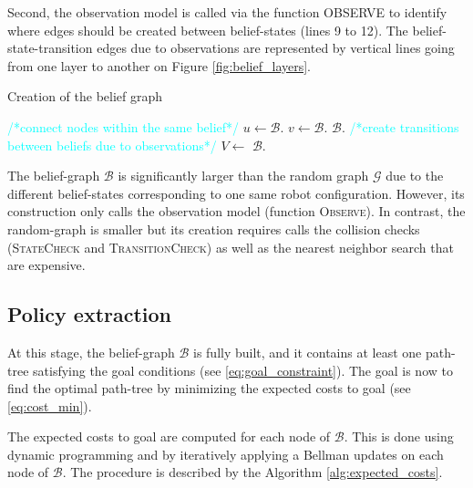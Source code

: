 \documentclass[letterpaper, 10 pt, conference]{ieeeconf}  %
\begin{document}
Second, the observation model is called via the function \textsc{OBSERVE} to identify where edges should be created between belief-states (lines 9 to 12). The belief-state-transition edges due to observations are represented by vertical lines going from one layer to another on Figure \ref{fig:belief_layers}.

\begin{algorithm}[H]
\caption{Creation of the belief graph}
\label{alg:belief}
\begin{algorithmic}[1]
	\State \textcolor{cyan}{\footnotesize/*connect nodes within the same belief*/}
			\State $u \gets \mathcal{B}$.
			\State $v \gets \mathcal{B}$.
			\State $\mathcal{B}$.
		\EndFor
	\EndFor
	\State \textcolor{cyan}{\footnotesize/*create transitions between beliefs due to observations*/}
	   	\State $V \gets$ 
			\State $\mathcal{B}$.
		\EndFor
	\EndFor
\EndFunction
\end{algorithmic}
\end{algorithm}

The belief-graph $\mathcal{B}$ is significantly larger than the random graph $\mathcal{G}$ due to the different belief-states corresponding to one same robot configuration. However, its construction only calls the observation model (function \textsc{Observe}). In contrast, the random-graph is smaller but its creation requires calls the collision checks (\textsc{StateCheck} and \textsc{TransitionCheck}) as well as the nearest neighbor search that are expensive.

\subsection{Policy extraction}
\label{section:policy-extraction}

At this stage, the belief-graph $\mathcal{B}$ is fully built, and it contains at least one path-tree satisfying the goal conditions (see \ref{eq:goal_constraint}). The goal is now to find the optimal path-tree by minimizing the expected costs to goal (see \ref{eq:cost_min}).

The expected costs to goal are computed for each node of $\mathcal{B}$. This is done using dynamic programming and by iteratively applying a Bellman updates on each node of $\mathcal{B}$.
The procedure is described by the Algorithm \ref{alg:expected_costs}.
\end{document}
